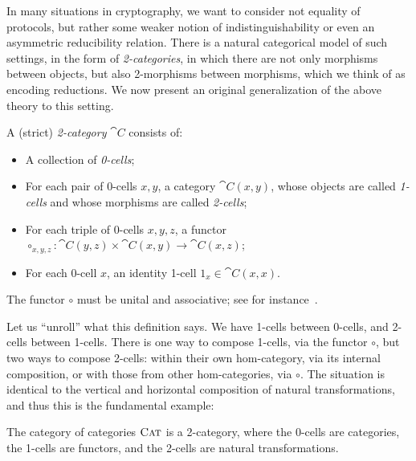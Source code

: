 In many situations in cryptography, we want to consider not
equality of protocols, but rather some weaker notion of indistinguishability or
even an asymmetric reducibility relation. There is a natural categorical model
of such settings, in the form of \emph{2-categories}, in which there are not
only morphisms between objects, but also 2-morphisms between morphisms, which we
think of as encoding reductions. We now present an original generalization of
the above theory to this setting.

\begin{dfn}
  A (strict) \emph{2-category} $\cat{C}$ consists of:
  \begin{itemize}
    \item A collection of \emph{0-cells};
    \item For each pair of 0-cells $x,y$, a category $\cat{C}(x, y)$, whose
      objects are called \emph{1-cells} and whose morphisms are called
      \emph{2-cells};
    \item For each triple of 0-cells $x,y,z$, a functor $\circ_{x,y,z}: \cat{C}(y, z)\times \cat{C}(x, y)\to \cat{C}(x, z)$;
    \item For each 0-cell $x$, an identity 1-cell $1_x\in\cat{C}(x, x)$.
  \end{itemize}
  The functor $\circ$ must be unital and associative; see for instance~\cite{kelly-1981}.
\end{dfn}

Let us ``unroll'' what this definition says. We have 1-cells between 0-cells,
and 2-cells between 1-cells. There is one way to compose 1-cells, via the
functor $\circ$, but two ways to compose 2-cells: within their own hom-category,
via its internal composition, or with those from other hom-categories, via
$\circ$. The situation is identical to the vertical and horizontal composition
of natural transformations, and thus this is the fundamental example:

\begin{ex}
  The category of categories ${\textsc{\text{Cat}}}$ is a 2-category, where the 0-cells are
  categories, the 1-cells are functors, and the 2-cells are natural
  transformations.
\end{ex}

